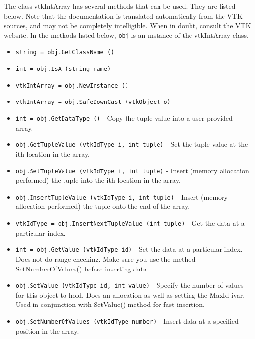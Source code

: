 The class vtkIntArray has several methods that can be used.
  They are listed below.
Note that the documentation is translated automatically from the VTK sources,
and may not be completely intelligible.  When in doubt, consult the VTK website.
In the methods listed below, \verb|obj| is an instance of the vtkIntArray class.
\begin{itemize}
\item  \verb|string = obj.GetClassName ()|

\item  \verb|int = obj.IsA (string name)|

\item  \verb|vtkIntArray = obj.NewInstance ()|

\item  \verb|vtkIntArray = obj.SafeDownCast (vtkObject o)|

\item  \verb|int = obj.GetDataType ()| -  Copy the tuple value into a user-provided array.

\item  \verb|obj.GetTupleValue (vtkIdType i, int tuple)| -  Set the tuple value at the ith location in the array.

\item  \verb|obj.SetTupleValue (vtkIdType i, int tuple)| -  Insert (memory allocation performed) the tuple into the ith location
 in the array.

\item  \verb|obj.InsertTupleValue (vtkIdType i, int tuple)| -  Insert (memory allocation performed) the tuple onto the end of the array.

\item  \verb|vtkIdType = obj.InsertNextTupleValue (int tuple)| -  Get the data at a particular index.

\item  \verb|int = obj.GetValue (vtkIdType id)| -  Set the data at a particular index. Does not do range checking. Make sure
 you use the method SetNumberOfValues() before inserting data.

\item  \verb|obj.SetValue (vtkIdType id, int value)| -  Specify the number of values for this object to hold. Does an
 allocation as well as setting the MaxId ivar. Used in conjunction with
 SetValue() method for fast insertion.

\item  \verb|obj.SetNumberOfValues (vtkIdType number)| -  Insert data at a specified position in the array.


\end{itemize}
